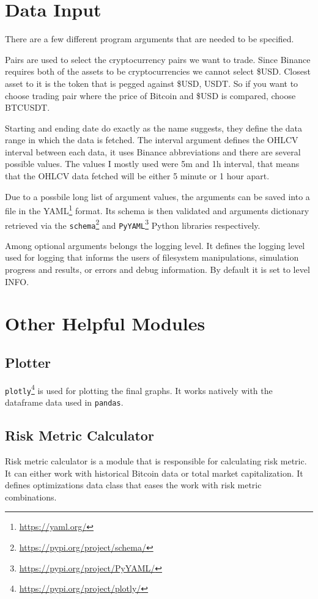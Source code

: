 \section{Data Input}
There are a few different program arguments that are needed to be specified.

Pairs are used to select the cryptocurrency pairs we want to trade. Since Binance requires both of the assets to be cryptocurrencies we cannot select \$USD. Closest asset to it is the token that is pegged against \$USD, USDT. So if you want to choose trading pair where the price of Bitcoin and \$USD is compared, choose BTCUSDT.

Starting and ending date do exactly as the name suggests, they define the data range in which the data is fetched. The interval argument defines the OHLCV interval between each data, it uses Binance abbreviations and there are several possible values. The values I mostly used were 5m and 1h interval, that means that the OHLCV data fetched will be either 5 minute or 1 hour apart.

Due to a possbile long list of argument values, the arguments can be saved into a file in the YAML\footnote{\url{https://yaml.org/}} format. Its schema is then validated and arguments dictionary retrieved via the \texttt{schema}\footnote{\url{https://pypi.org/project/schema/}} and \texttt{PyYAML}\footnote{\url{https://pypi.org/project/PyYAML/}} Python libraries respectively.

Among optional arguments belongs the logging level. It defines the logging level used for logging that informs the users of filesystem manipulations, simulation progress and results, or errors and debug information. By default it is set to level INFO.

\section{Other Helpful Modules}

\subsection*{Plotter}
\texttt{plotly}\footnote{\url{https://pypi.org/project/plotly/}} is used for plotting the final graphs. It works natively with the dataframe data used in \texttt{pandas}.

\subsection*{Risk Metric Calculator}
Risk metric calculator is a module that is responsible for calculating risk metric. It can either work with historical Bitcoin data or total market capitalization. It defines optimizations data class that eases the work with risk metric combinations.

